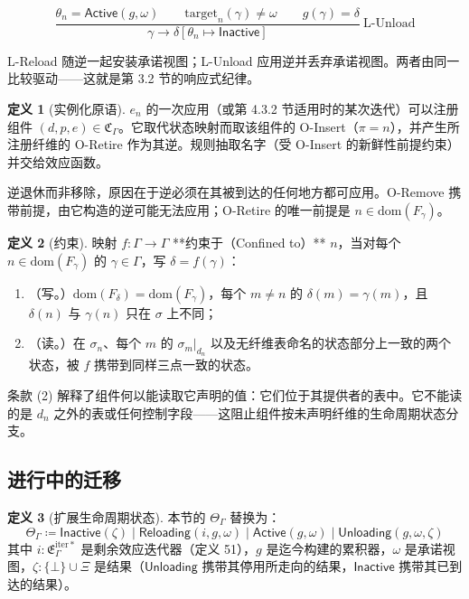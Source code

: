 \documentclass[11pt,a4paper]{article}
\theoremstyle{plain}
\theoremstyle{definition}
\newtheorem{definition}{定义}
\theoremstyle{remark}
\begin{document}
\[
\frac{\theta_n = \mathsf{Active}(g, \omega) \qquad \mathrm{target}_n(\gamma) \neq \omega \qquad g(\gamma) = \delta}
{\gamma \longrightarrow \delta[\theta_n \mapsto \mathsf{Inactive}]}\ \text{L-Unload}
\]

L-Reload 随逆一起安装承诺视图；L-Unload 应用逆并丢弃承诺视图。两者由同一比较驱动——这就是第 3.2 节的响应式纪律。

\begin{definition}[实例化原语]
$e_n$ 的一次应用（或第 4.3.2 节适用时的某次迭代）可以注册组件 $(d, p, e) \in \mathfrak{C}_\Gamma$。它取代状态映射而取该组件的 O-Insert（$\pi = n$），并产生所注册纤维的 O-Retire 作为其逆。规则抽取名字（受 O-Insert 的新鲜性前提约束）并交给效应函数。
\end{definition}

逆退休而非移除，原因在于逆必须在其被到达的任何地方都可应用。O-Remove 携带前提，由它构造的逆可能无法应用；O-Retire 的唯一前提是 $n \in \mathrm{dom}(F_\gamma)$。

\begin{definition}[约束]
映射 $f : \Gamma \to \Gamma$ **约束于（Confined to）** $n$，当对每个 $n \in \mathrm{dom}(F_\gamma)$ 的 $\gamma \in \Gamma$，写 $\delta = f(\gamma)$：
\begin{enumerate}
\item（写。）$\mathrm{dom}(F_\delta) = \mathrm{dom}(F_\gamma)$，每个 $m \neq n$ 的 $\delta(m) = \gamma(m)$，且 $\delta(n)$ 与 $\gamma(n)$ 只在 $\sigma$ 上不同；
\item（读。）在 $\sigma_n$、每个 $m$ 的 $\sigma_m|_{d_n}$ 以及无纤维表命名的状态部分上一致的两个状态，被 $f$ 携带到同样三点一致的状态。
\end{enumerate}
\end{definition}

条款 (2) 解释了组件何以能读取它声明的值：它们位于其提供者的表中。它不能读的是 $d_n$ 之外的表或任何控制字段——这阻止组件按未声明纤维的生命周期状态分支。

\subsection{进行中的迁移}

\begin{definition}[扩展生命周期状态]
本节的 $\Theta_\Gamma$ 替换为：
\[
\Theta_\Gamma \coloneqq \mathsf{Inactive}(\zeta) \mid \mathsf{Reloading}(i, g, \omega) \mid \mathsf{Active}(g, \omega) \mid \mathsf{Unloading}(g, \omega, \zeta) \tag{43}
\]
其中 $i : \mathfrak{E}_\Gamma^{\mathrm{iter}\ast}$ 是剩余效应迭代器（定义 51），$g$ 是迄今构建的累积器，$\omega$ 是承诺视图，$\zeta : \{\bot\} \cup \Xi$ 是结果（$\mathsf{Unloading}$ 携带其停用所走向的结果，$\mathsf{Inactive}$ 携带其已到达的结果）。
\end{definition}
\end{document}
